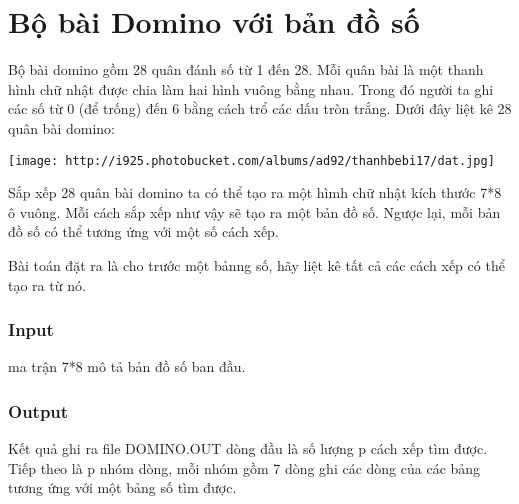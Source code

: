 



\section{\textbf{    Bộ bài Domino với bản đồ số   }}




   Bộ bài domino gồm 28 quân đánh số từ 1 đến 28. Mỗi quân bài là một thanh hình chữ nhật được chia làm hai hình vuông bằng nhau. Trong đó người ta ghi các số từ 0 (để trống) đến 6 bằng cách trổ các dấu tròn trắng. Dưới đây liệt kê 28 quân bài domino:   



\texttt{[image: http://i925.photobucket.com/albums/ad92/thanhbebi17/dat.jpg]}


   Sắp xếp 28 quân bài domino ta có thể tạo ra một hìmh chữ nhật kích thước 7*8 ô vuông. Mỗi cách sắp xếp như vậy sẽ tạo ra một bản đồ số. Ngược lại, mỗi bản đồ số có thể tương ứng với một số cách xếp.   


   Bài toán đặt ra là cho trước một bảnng số, hãy liệt kê tất cả các cách xếp có thể tạo ra từ nó.  

\subsubsection{   Input  }

   ma trận 7*8 mô tả bản đồ số ban đầu.  

\subsubsection{   Output  }

   Kết quả ghi ra file DOMINO.OUT dòng đầu là số lượng p cách xếp tìm được. Tiếp theo là p nhóm dòng, mỗi nhóm gồm 7 dòng ghi các dòng của các bảng tương ứng với một bảng số tìm được.  


